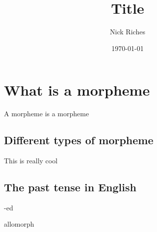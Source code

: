 \documentclass[a4paper,11pt]{article}
\begin{document}

\title{Title}
\author{Nick Riches}
\date{\today}


\hypertarget{what-is-a-morpheme}{%
\section{What is a morpheme}\label{what-is-a-morpheme}}

A morpheme is a morpheme

\hypertarget{different-types-of-morpheme}{%
\subsection{Different types of
morpheme}\label{different-types-of-morpheme}}

This is really cool

\hypertarget{the-past-tense-in-english}{%
\subsection{The past tense in English}\label{the-past-tense-in-english}}

-ed

allomorph
\end{document}
